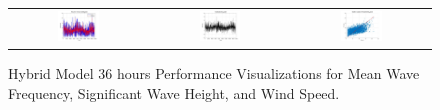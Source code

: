\begin{figure}[ht!]
\begin{tabular}{ccc}
    \includegraphics[width=0.32\textwidth]{graphs/hybrid/36 hours/wind_speed/actual vs forecast.jpg} &
    \includegraphics[width=0.32\textwidth]{graphs/hybrid/36 hours/wind_speed/residuals.jpg} &
    \includegraphics[width=0.32\textwidth]{graphs/hybrid/36 hours/wind_speed/scatter plot.jpg} \\
  \end{tabular}
  \caption{Hybrid Model 36 hours Performance Visualizations for Mean Wave Frequency, Significant Wave Height, and Wind Speed.}
  \label{fig:hybrid_36_hours}
\end{figure}

